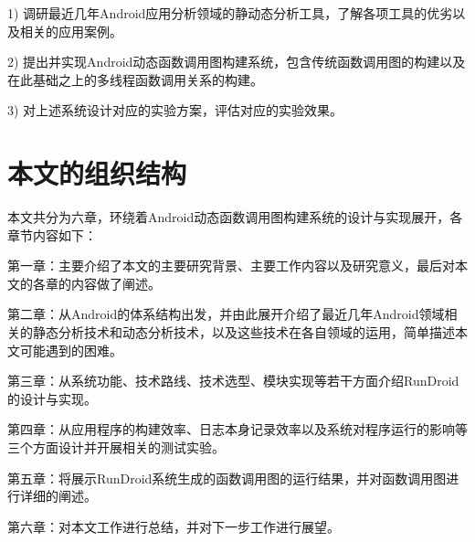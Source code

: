 1)	调研最近几年Android应用分析领域的静动态分析工具，了解各项工具的优劣以及相关的应用案例。

2)	提出并实现Android动态函数调用图构建系统，包含传统函数调用图的构建以及在此基础之上的多线程函数调用关系的构建。

3)	对上述系统设计对应的实验方案，评估对应的实验效果。

\section{本文的组织结构}

本文共分为六章，环绕着Android动态函数调用图构建系统的设计与实现展开，各章节内容如下：

第一章：主要介绍了本文的主要研究背景、主要工作内容以及研究意义，最后对本文的各章的内容做了阐述。

第二章：从Android的体系结构出发，并由此展开介绍了最近几年Android领域相关的静态分析技术和动态分析技术，以及这些技术在各自领域的运用，简单描述本文可能遇到的困难。

第三章：从系统功能、技术路线、技术选型、模块实现等若干方面介绍RunDroid的设计与实现。

第四章：从应用程序的构建效率、日志本身记录效率以及系统对程序运行的影响等三个方面设计并开展相关的测试实验。

第五章：将展示RunDroid系统生成的函数调用图的运行结果，并对函数调用图进行详细的阐述。

第六章：对本文工作进行总结，并对下一步工作进行展望。

